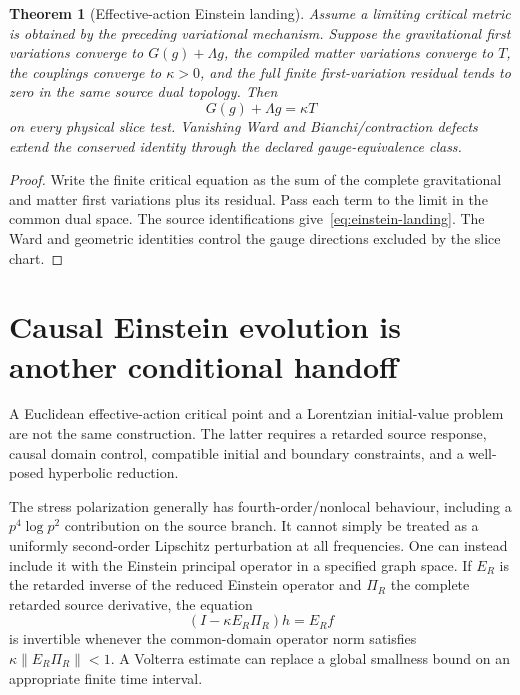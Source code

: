 \documentclass[11pt,a4paper,oneside]{book}
\theoremstyle{plain}
\newtheorem{theorem}{Theorem}[chapter]
\theoremstyle{definition}
\theoremstyle{remark}
\newcommand{\norm}[1]{\left\lVert#1\right\rVert}
\newcommand{\src}[2]{\cite{#1}}
\begin{document}
\begin{theorem}[Effective-action Einstein landing]
\label{thm:einstein-landing}
Assume a limiting critical metric is obtained by the preceding variational mechanism. Suppose the gravitational first variations converge to $G(g)+\Lambda g$, the compiled matter variations converge to $T$, the couplings converge to $\kappa>0$, and the full finite first-variation residual tends to zero in the same source dual topology. Then
\begin{equation}
 G(g)+\Lambda g=\kappa T
 \label{eq:einstein-landing}
\end{equation}
on every physical slice test. Vanishing Ward and Bianchi/contraction defects extend the conserved identity through the declared gauge-equivalence class.
\end{theorem}
\begin{proof}
Write the finite critical equation as the sum of the complete gravitational and matter first variations plus its residual. Pass each term to the limit in the common dual space. The source identifications give~\eqref{eq:einstein-landing}. The Ward and geometric identities control the gauge directions excluded by the slice chart.
\end{proof}
\src{R18}{thm:v18v49-einstein-closure}

\section{Causal Einstein evolution is another conditional handoff}
A Euclidean effective-action critical point and a Lorentzian initial-value problem are not the same construction. The latter requires a retarded source response, causal domain control, compatible initial and boundary constraints, and a well-posed hyperbolic reduction.

The stress polarization generally has fourth-order/nonlocal behaviour, including a $p^4\log p^2$ contribution on the source branch. It cannot simply be treated as a uniformly second-order Lipschitz perturbation at all frequencies. One can instead include it with the Einstein principal operator in a specified graph space. If $E_R$ is the retarded inverse of the reduced Einstein operator and $\Pi_R$ the complete retarded source derivative, the equation
\begin{equation}
 (I-\kappa E_R\Pi_R)h=E_Rf
 \label{eq:causal-einstein}
\end{equation}
is invertible whenever the common-domain operator norm satisfies $\kappa\norm{E_R\Pi_R}<1$. A Volterra estimate can replace a global smallness bound on an appropriate finite time interval. \src{R2}{thm:v2v93-Ward-Neumann}
\end{document}
